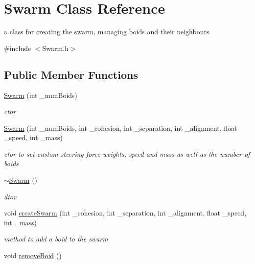\hypertarget{classSwarm}{\section{Swarm Class Reference}
\label{classSwarm}
}


a class for creating the swarm, managing boids and their neighbours  




{\ttfamily \#include $<$Swarm.\-h$>$}

\subsection*{Public Member Functions}
\begin{DoxyCompactItemize}
\item 
\hyperlink{classSwarm_af3423d580972ffbe9a1b7befb8d75caf}{Swarm} (int \-\_\-num\-Boids)
\begin{DoxyCompactList}\small\item\em ctor \end{DoxyCompactList}\item 
\hyperlink{classSwarm_ac2a239ad48e9d468b8d6de0f321dbabb}{Swarm} (int \-\_\-num\-Boids, int \-\_\-cohesion, int \-\_\-separation, int \-\_\-alignment, float \-\_\-speed, int \-\_\-mass)
\begin{DoxyCompactList}\small\item\em ctor to set custom steering force weights, speed and mass as well as the number of boids \end{DoxyCompactList}\item 
\hypertarget{classSwarm_a5d74bf7e768edf0d8930ba187005a583}{\hyperlink{classSwarm_a5d74bf7e768edf0d8930ba187005a583}{$\sim$\-Swarm} ()}\label{classSwarm_a5d74bf7e768edf0d8930ba187005a583}

\begin{DoxyCompactList}\small\item\em dtor \end{DoxyCompactList}\item 
void \hyperlink{classSwarm_aaf270a2467917858d8f8a636c04783e7}{create\-Swarm} (int \-\_\-cohesion, int \-\_\-separation, int \-\_\-alignment, float \-\_\-speed, int \-\_\-mass)
\begin{DoxyCompactList}\small\item\em method to add a boid to the swarm \end{DoxyCompactList}\item 
\hypertarget{classSwarm_a69fc2af93e0ec34bdcd309f34e7be3ab}{void \hyperlink{classSwarm_a69fc2af93e0ec34bdcd309f34e7be3ab}{remove\-Boid} ()}\label{classSwarm_a69fc2af93e0ec34bdcd309f34e7be3ab}


\end{DoxyCompactItemize}
